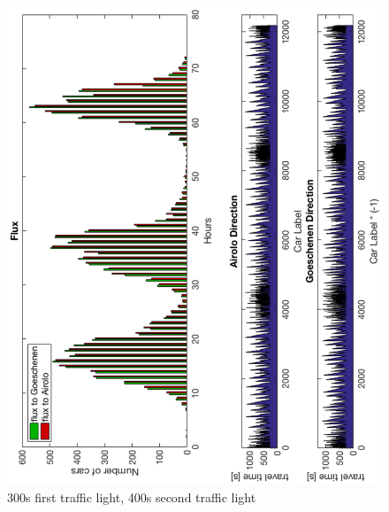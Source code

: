 \documentclass[11pt,a4paper,parskip=half-]{article}
\begin{document}
\begin{figure}[h!]
\includegraphics[scale=0.88]{300_400_3g}
\centering
\vspace*{-4mm}
\caption{300s first traffic light, 400s second traffic light}
\label{fig:300_400_3g}
\end{figure}
\end{document}
